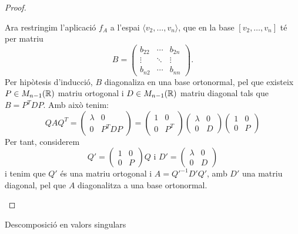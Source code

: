 \documentclass[
  11pt,
]{book}
\makeatletter
\numberwithin{dummy}{section}
\theoremstyle{maincolornumbox}
\theoremstyle{blacknumex}
\theoremstyle{blacknumbox}
\theoremstyle{maincolornum}
\renewcommand{\section}{\@startsection{section}{1}{\z@}
{-4ex \@plus -1ex \@minus -.4ex}
{1ex \@plus.2ex }
{\normalfont\large\sffamily\bfseries}}
\newlength\esp
\makeatother
\begin{document}
\begin{proof}
\begin{itemize}
  Ara restringim l'aplicació \(f_A\) a l'espai
  \(\langle v_2, \dots , v_n\rangle\), que en la base
  \([v_2, \dots , v_n]\) té per matriu
  \[B=\begin{pmatrix} b_{22} & \cdots & b_{2n} \\
      \vdots & \ddots & \vdots \\
      b_{n2} & \cdots  & b_{nn}
      \end{pmatrix} .\] Per hipòtesis d'inducció, \(B\) diagonaliza en
  una base ortonormal, pel que existeix \(P\in M_{n-1}(\mathbb{R})\) matriu
  ortogonal i \(D\in M_{n-1}(\mathbb{R})\) matriu diagonal tals que \(B=P^TDP\).
  Amb això tenim: \[QAQ^T=\left(\begin{array}{c|c}
          \lambda & 0 \\ \hline
          0 & P^T D P
      \end{array}\right)=
      \left(\begin{array}{c|c}
          1 & 0 \\ \hline
          0 & P^T
      \end{array}\right)
      \left(\begin{array}{c|c}
          \lambda & 0 \\ \hline
          0 & D 
      \end{array}\right)
      \left(\begin{array}{c|c}
          1 & 0 \\ \hline
          0 &  P
      \end{array}\right)\] Per tant, considerem
  \[Q'=\left(\begin{array}{c|c}
          1 & 0 \\ \hline
          0 &  P
      \end{array}\right) Q \text{ i }
      D'=\left(\begin{array}{c|c}
          \lambda & 0 \\ \hline
          0 & D 
      \end{array}\right)\] i tenim que \(Q'\) és una matriu ortogonal i
  \(A=Q'^{-1} D' Q'\), amb \(D'\) una matriu diagonal, pel que \(A\)
  diagonalitza a una base ortonormal.
\end{itemize}

\end{proof}

\hypertarget{descomposiciuxf3-en-valors-singulars}{%
\section{Descomposició en valors singulars}\label{descomposiciuxf3-en-valors-singulars}}
\end{document}
